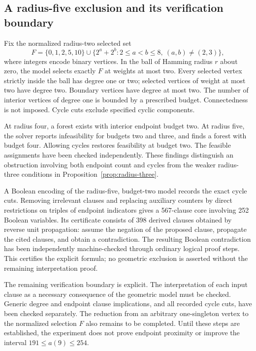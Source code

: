 \documentclass[11pt,a4paper]{article}
\theoremstyle{definition}
\theoremstyle{remark}
\begin{document}
\subsection{A radius-five exclusion and its verification boundary}
Fix the normalized radius-two selected set
\[
F=\{0,1,2,5,10\}\cup
\{2^a+2^b:2\le a<b\le8,\ (a,b)\ne(2,3)\},
\]
where integers encode binary vertices. In the ball of Hamming radius $r$ about zero, the model selects exactly $F$ at weights at most two. Every selected vertex strictly inside the ball has degree one or two; selected vertices of weight at most two have degree two. Boundary vertices have degree at most two. The number of interior vertices of degree one is bounded by a prescribed budget. Connectedness is not imposed. Cycle cuts exclude specified cyclic components.

At radius four, a forest exists with interior endpoint budget two. At radius five, the solver reports infeasibility for budgets two and three, and finds a forest with budget four. Allowing cycles restores feasibility at budget two. The feasible assignments have been checked independently. These findings distinguish an obstruction involving both endpoint count and cycles from the weaker radius-three conditions in Proposition~\ref{prop:radius-three}.

A Boolean encoding of the radius-five, budget-two model records the exact cycle cuts. Removing irrelevant clauses and replacing auxiliary counters by direct restrictions on triples of endpoint indicators gives a 567-clause core involving 252 Boolean variables. Its certificate consists of 398 derived clauses obtained by reverse unit propagation: assume the negation of the proposed clause, propagate the cited clauses, and obtain a contradiction. The resulting Boolean contradiction has been independently machine-checked through ordinary logical proof steps. This certifies the explicit formula; no geometric exclusion is asserted without the remaining interpretation proof.

The remaining verification boundary is explicit. The interpretation of each input clause as a necessary consequence of the geometric model must be checked. Generic degree and endpoint clause implications, and all recorded cycle cuts, have been checked separately. The reduction from an arbitrary one-singleton vertex to the normalized selection $F$ also remains to be completed. Until these steps are established, the experiment does not prove endpoint proximity or improve the interval $191\le a(9)\le254$.
\end{document}
